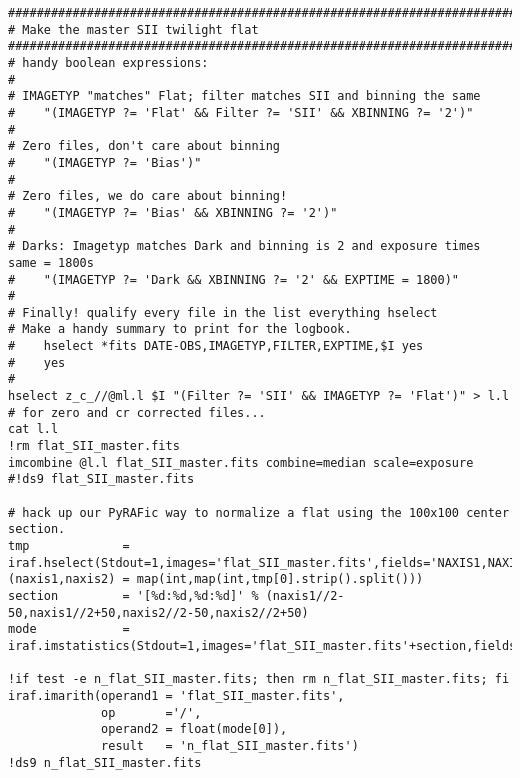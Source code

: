\documentclass[letter,11pt,oneside]{article}
\begin{document}
\begin{landscape}
\begingroup \fontsize{10pt}{10pt}
\selectfont
\begin{verbatim} 
#############################################################################
# Make the master SII twilight flat
#############################################################################
# handy boolean expressions:
#
# IMAGETYP "matches" Flat; filter matches SII and binning the same
#    "(IMAGETYP ?= 'Flat' && Filter ?= 'SII' && XBINNING ?= '2')"
#
# Zero files, don't care about binning
#    "(IMAGETYP ?= 'Bias')"
#
# Zero files, we do care about binning!
#    "(IMAGETYP ?= 'Bias' && XBINNING ?= '2')"
#
# Darks: Imagetyp matches Dark and binning is 2 and exposure times same = 1800s
#    "(IMAGETYP ?= 'Dark && XBINNING ?= '2' && EXPTIME = 1800)"
#
# Finally! qualify every file in the list everything hselect 
# Make a handy summary to print for the logbook.
#    hselect *fits DATE-OBS,IMAGETYP,FILTER,EXPTIME,$I yes
#    yes
#
hselect z_c_//@ml.l $I "(Filter ?= 'SII' && IMAGETYP ?= 'Flat')" > l.l   # for zero and cr corrected files...
cat l.l
!rm flat_SII_master.fits
imcombine @l.l flat_SII_master.fits combine=median scale=exposure
#!ds9 flat_SII_master.fits

# hack up our PyRAFic way to normalize a flat using the 100x100 center section.
tmp             = iraf.hselect(Stdout=1,images='flat_SII_master.fits',fields='NAXIS1,NAXIS2',expr=iraf.yes)
(naxis1,naxis2) = map(int,map(int,tmp[0].strip().split()))
section         = '[%d:%d,%d:%d]' % (naxis1//2-50,naxis1//2+50,naxis2//2-50,naxis2//2+50)
mode            = iraf.imstatistics(Stdout=1,images='flat_SII_master.fits'+section,fields='mode',format=iraf.no)

!if test -e n_flat_SII_master.fits; then rm n_flat_SII_master.fits; fi
iraf.imarith(operand1 = 'flat_SII_master.fits',
             op       ='/',
             operand2 = float(mode[0]),
             result   = 'n_flat_SII_master.fits')
!ds9 n_flat_SII_master.fits
\end{verbatim}
\endgroup
\end{landscape}

\clearpage
\end{document}
